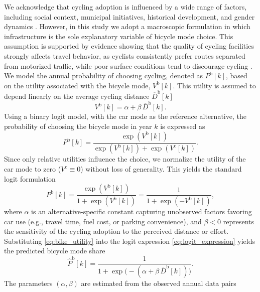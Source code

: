 \documentclass[lettersize,journal]{IEEEtran}
\begin{document}
We acknowledge that cycling adoption is influenced by a wide range of factors, including social context, municipal initiatives, historical development, and gender dynamics \cite{glachant2024negotiating, parsha2022social}. 
However, in this study we adopt a macroscopic formulation in which infrastructure is the sole explanatory variable of bicycle mode choice. 
This assumption is supported by evidence showing that the quality of cycling facilities strongly affects travel behavior, as cyclists consistently prefer routes separated from motorized traffic, while poor surface conditions tend to discourage cycling \cite{buehler2016bikeway, adam2024agent}. We model the annual probability of choosing cycling, denoted as $ P^\mathrm{b}[k] $, based on the utility associated with the bicycle mode, $ V^\mathrm{b}[k] $. 
This utility is assumed to depend linearly on the average cycling distance $ \overline{D}^\mathrm{b}[k] $
\begin{equation}
\label{eq:bike_utility}
    V^\mathrm{b}[k] = \alpha + \beta\,\overline{D}^\mathrm{b}[k].
\end{equation}
Using a binary logit model, with the car mode as the reference alternative, the probability of choosing the bicycle mode in year $ k $ is expressed as
\begin{equation}
    P^\mathrm{b}[k] = 
    \frac{\exp(V^\mathrm{b}[k])}{\exp(V^\mathrm{b}[k]) + \exp(V^\mathrm{c}[k])}.
\end{equation}
Since only relative utilities influence the choice, we normalize the utility of the car mode to zero ($ V^\mathrm{c} \equiv 0 $) without loss of generality. 
This yields the standard logit formulation 
\begin{equation}
\label{eq:logit_expression}
    P^\mathrm{b}[k] = 
    \frac{\exp(V^\mathrm{b}[k])}{1 + \exp(V^\mathrm{b}[k])}
    = \frac{1}{1 + \exp(-V^\mathrm{b}[k])},
\end{equation}
where $ \alpha $ is an alternative-specific constant capturing unobserved 
factors favoring car use (e.g., travel time, fuel cost, or parking convenience),
and $ \beta < 0 $ represents the sensitivity of the cycling adoption to the
perceived distance or effort. Substituting \eqref{eq:bike_utility} into the logit expression \eqref{eq:logit_expression} yields the predicted 
bicycle mode share
\begin{equation}
    \widehat{P}^\mathrm{b}[k] = 
    \frac{1}{1 + \exp\!\big(-(\alpha + \beta\,\overline{D}^\mathrm{b}[k])\big)}.
\end{equation}
The parameters $ (\alpha, \beta) $ are estimated from the observed annual data pairs
\end{document}
